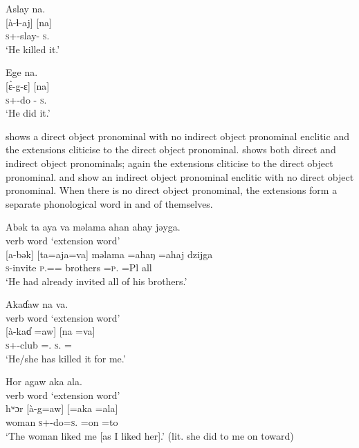 \ea\label{ex:7:4}
Aslay na.\\
\gll {}[à-ɬ{}-aj] \hspace{35pt}   [na]\\
\textsc{s}+{\PFV}-slay-{\CL} {} \textsc{s}.{\DO}\\
\glt ‘He killed it.’
\z

\ea\label{ex:7:5}
Ege   na.\\
\gll {}[\`ɛ-g-ɛ]  \hspace{45pt}  [na]\\
\textsc{s}+{\PFV}-do -{\CL}{} \textsc{s}.{\DO}\\
\glt ‘He did it.’
\z

  shows a direct object pronominal with no indirect object pronominal enclitic and the extensions cliticise to the direct object pronominal.   shows both direct and indirect object pronominals; again the extensions cliticise to the direct object pronominal.   and  show an indirect object pronominal enclitic with no direct object pronominal. When there is no direct object pronominal, the extensions form a separate phonological word in and of themselves. 

\ea\label{ex:7:6}
Abək  ta  aya  va  məlama  ahan  ahay  jəyga.\\
 verb word \hspace{9pt} ‘extension word’\\
\gll {}[a-bək] \hspace{15pt}  [ta=aja=va]  \hspace{10pt}  məlama  =ahaŋ    =ahaj  dzijga\\
\textsc{s}-invite \hspace{15pt}  \textsc{p}.{\DO}={\PLU}={\PRF} {}  brothers  =\textsc{p}.{\POSS}  =Pl  all\\
\glt ‘He had already invited all of his brothers.’  
\z

\ea\label{ex:7:7}
Akaɗaw  na  va. \\
verb word  \hspace{36pt}        ‘extension word’\\
\gll {}[à-kaɗ  =aw]    [na  =va]\\
\textsc{s}+{\PFV}-club ={\oneS}.{\IO}    \textsc{s}.{\DO}  ={\PRF}\\
\glt ‘He/she has killed it for me.’ 
\z

\ea\label{ex:7:8}
Hor  agaw  aka  ala.\\
\hspace{30pt} verb word \hspace{28pt} ‘extension word’\\
\gll hʷɔr    [à-g=aw]     [=aka   =ala]\\
woman  \textsc{s}+{\PFV}-do=\textsc{s}.{\IO}   =on   =to\\
\glt ‘The woman liked me [as I liked her].’ (lit. she did to me on toward)  
\z

